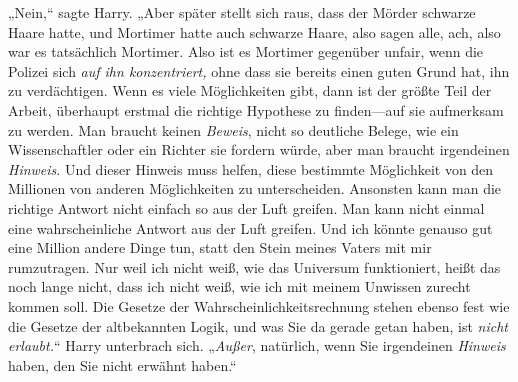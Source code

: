 „Nein,“ sagte Harry. „Aber später stellt sich raus, dass der Mörder schwarze Haare hatte, und Mortimer hatte auch schwarze Haare, also sagen alle, ach, also war es tatsächlich Mortimer. Also ist es Mortimer gegenüber unfair, wenn die Polizei sich \emph{auf ihn konzentriert,} ohne dass sie bereits einen guten Grund hat, ihn zu verdächtigen. Wenn es viele Möglichkeiten gibt, dann ist der größte Teil der Arbeit, überhaupt erstmal die richtige Hypothese zu finden—auf sie aufmerksam zu werden. Man braucht keinen \emph{Beweis}, nicht so deutliche Belege, wie ein Wissenschaftler oder ein Richter sie fordern würde, aber man braucht irgendeinen \emph{Hinweis}. Und dieser Hinweis muss helfen, diese bestimmte Möglichkeit von den Millionen von anderen Möglichkeiten zu unterscheiden. Ansonsten kann man die richtige Antwort nicht einfach so aus der Luft greifen. Man kann nicht einmal eine wahrscheinliche Antwort aus der Luft greifen. Und ich könnte genauso gut eine Million andere Dinge tun, statt den Stein meines Vaters mit mir rumzutragen. Nur weil ich nicht weiß, wie das Universum funktioniert, heißt das noch lange nicht, dass ich nicht weiß, wie ich mit meinem Unwissen zurecht kommen soll. Die Gesetze der Wahrscheinlichkeitsrechnung stehen ebenso fest wie die Gesetze der altbekannten Logik, und was Sie da gerade getan haben, ist \emph{nicht erlaubt.}“ Harry unterbrach sich. „\emph{Außer}, natürlich, wenn Sie irgendeinen \emph{Hinweis} haben, den Sie nicht erwähnt haben.“

